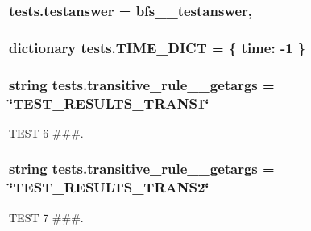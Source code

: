 \subsubsection[{testanswer}]{\setlength{\rightskip}{0pt plus 5cm}tests.\+testanswer = {\bf bfs\+\_\+\_\+testanswer},}\label{namespacetests_a22d7b2dd14bb95e8f85cfb851ddad3df}
\hypertarget{namespacetests_aea36cbc2a5be89562f35ed50cd9f7a2a}{}
\subsubsection[{T\+I\+M\+E\+\_\+\+D\+I\+C\+T}]{\setlength{\rightskip}{0pt plus 5cm}dictionary tests.\+T\+I\+M\+E\+\_\+\+D\+I\+C\+T = \{ \textquotesingle{}time\textquotesingle{}\+: -\/1 \}}\label{namespacetests_aea36cbc2a5be89562f35ed50cd9f7a2a}
\hypertarget{namespacetests_a8e59406dc0d4b23e9fb197f1ab770abf}{}
\subsubsection[{transitive\+\_\+rule\+\_\+1\+\_\+getargs}]{\setlength{\rightskip}{0pt plus 5cm}string tests.\+transitive\+\_\+rule\+\_\+\_\+getargs = \char`\"{}T\+E\+S\+T\+\_\+\+R\+E\+S\+U\+L\+T\+S\+\_\+\+T\+R\+A\+N\+S1\char`\"{}}\label{namespacetests_a8e59406dc0d4b23e9fb197f1ab770abf}


T\+E\+S\+T 6 \#\#\#. 

\hypertarget{namespacetests_a7e17149eb31661fd855e43033e0313ec}{}
\subsubsection[{transitive\+\_\+rule\+\_\+2\+\_\+getargs}]{\setlength{\rightskip}{0pt plus 5cm}string tests.\+transitive\+\_\+rule\+\_\+\_\+getargs = \char`\"{}T\+E\+S\+T\+\_\+\+R\+E\+S\+U\+L\+T\+S\+\_\+\+T\+R\+A\+N\+S2\char`\"{}}\label{namespacetests_a7e17149eb31661fd855e43033e0313ec}


T\+E\+S\+T 7 \#\#\#. 


